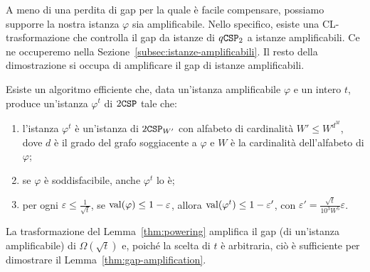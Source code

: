 A meno di una perdita di gap per la quale è facile compensare, possiamo supporre
la nostra istanza $\varphi$ sia amplificabile. Nello specifico, esiste una
CL-trasformazione che controlla il gap da istanze di $q\mathtt{CSP}_2$ a istanze
amplificabili. Ce ne occuperemo nella Sezione~\ref{subsec:istanze-amplificabili}.
Il resto della dimostrazione si occupa di amplificare il gap di istanze
amplificabili.

\begin{lemma} \label{thm:powering}
	Esiste un algoritmo efficiente che, data un'istanza amplificabile $\varphi$ e un
	intero $t$, produce un'istanza $\varphi^t$ di $2\mathtt{CSP}$ tale che:
	\begin{enumerate}[label=(\roman*)]
		\item l'istanza $\varphi^t$ è un'istanza di $2\mathtt{CSP}_{W'}$ con alfabeto
			di cardinalità $W' \le W^{d^{3 t}}$, dove $d$ è il grado del grafo
			soggiacente a $\varphi$ e $W$ è la cardinalità dell'alfabeto di $\varphi$;
		\item se $\varphi$ è soddisfacibile, anche $\varphi^t$ lo è;
		\item per ogni $\varepsilon \le \frac1{\sqrt{t}}$,
			se $\operatorname{val}(\varphi) \le 1 - \varepsilon$, allora
			$\operatorname{val}(\varphi^t) \le 1 - \varepsilon'$, con
			$\varepsilon' = \frac{\sqrt{t}}{10^3 W^5} \varepsilon$.
	\end{enumerate}
\end{lemma}

La trasformazione del Lemma~\ref{thm:powering} amplifica il gap (di un'istanza
amplificabile) di $\Omega(\sqrt{t})$ e, poiché la scelta di $t$ è arbitraria,
ciò è sufficiente per dimostrare il Lemma~\ref{thm:gap-amplification}.

